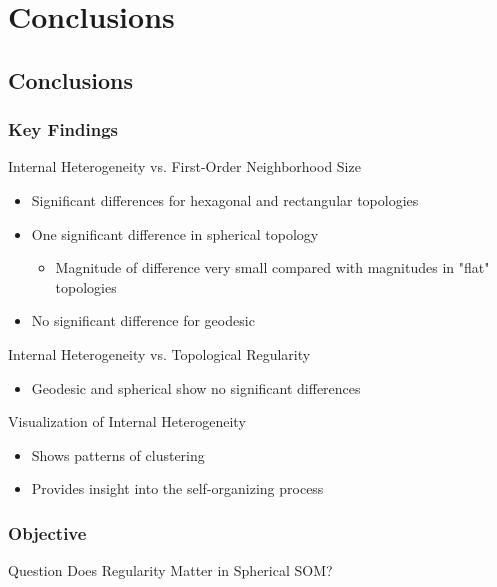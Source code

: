 \documentclass[nototal,handout]{beamer}
\begin{document}
\section{Conclusions} 

\subsection{Conclusions} 

\begin{frame}
	\frametitle{Key Findings}
 
\begin{block}{Internal Heterogeneity vs. First-Order Neighborhood Size}
 \begin{itemize}
 \item  Significant differences for hexagonal and rectangular topologies
 \item  One significant difference in spherical topology
 \begin{itemize}
 \item  Magnitude of difference very small compared with magnitudes in "flat" topologies
 \end{itemize}
 \item  No significant difference for geodesic
 \end{itemize}
 \end{block} 
\begin{block}{Internal Heterogeneity vs. Topological Regularity}
 \begin{itemize}
 \item  Geodesic and spherical show no significant differences
 \end{itemize}
 \end{block} 
\begin{block}{Visualization of Internal Heterogeneity}
 \begin{itemize}
 \item  Shows patterns of clustering
 \item  Provides insight into the self-organizing process
 \end{itemize}
 \end{block} \end{frame} 

\begin{frame}
	\frametitle{Objective}
 
\begin{block}{Question}
  Does Regularity Matter in Spherical SOM?
 \end{block} \end{frame} 
\end{document}
